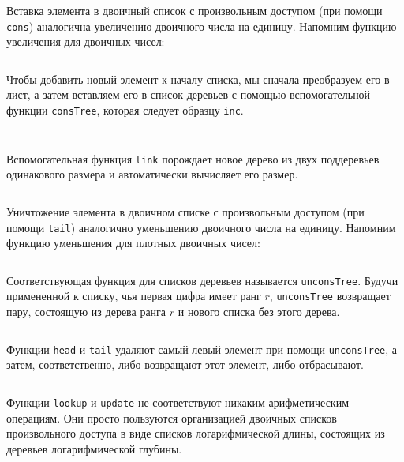 \begin{frame}[fragile]{}
Вставка элемента в двоичный список с произвольным доступом (при помощи
\lstinline!cons!) аналогична увеличению двоичного числа на
единицу. Напомним функцию увеличения для двоичных чисел:

\inputminted[firstline=5,lastline=7]{haskell}{code/DenseNumbers.hs}


Чтобы добавить новый элемент к началу списка, мы сначала преобразуем
его в лист, а затем вставляем его в список деревьев с помощью
вспомогательной функции \lstinline!consTree!, которая следует образцу
\lstinline!inc!.

\inputminted[firstline=30,lastline=30,gobble=2]{haskell}{code/BinaryRandomAccessList.lhs}
\inputminted[firstline=16,lastline=18]{haskell}{code/BinaryRandomAccessList.lhs}

Вспомогательная функция \lstinline!link! порождает новое дерево из двух
поддеревьев одинакового размера и автоматически вычисляет его размер.

\inputminted[firstline=14]{haskell}{code/BinaryRandomAccessList.lhs}
\end{frame}

\begin{frame}[fragile]{}
Уничтожение элемента в двоичном списке с произвольным доступом (при
помощи \lstinline!tail!) аналогично уменьшению двоичного числа на
единицу. Напомним функцию уменьшения для плотных двоичных чисел:
\inputminted[firstline=8,lastline=10]{haskell}{code/DenseNumbers.hs}

Соответствующая функция для списков деревьев называется
\lstinline!unconsTree!. Будучи примененной к списку, чья первая цифра
имеет ранг $r$, \lstinline!unconsTree! возвращает пару, состоящую из
дерева ранга $r$ и нового списка без этого дерева.
\inputminted[firstline=20,lastline=24]{haskell}{code/BinaryRandomAccessList.lhs}
\end{frame}

\begin{frame}[fragile]{}
Функции \lstinline!head! и \lstinline!tail!  удаляют самый левый
элемент при помощи \lstinline!unconsTree!, а затем, соответственно,
либо возвращают этот элемент, либо отбрасывают.
\inputminted[firstline=31,lastline=32]{haskell}{code/BinaryRandomAccessList.lhs}

Функции \lstinline!lookup! и \lstinline!update! не соответствуют
никаким арифметическим операциям. Они просто пользуются организацией
двоичных списков произвольного доступа в виде списков логарифмической
длины, состоящих из деревьев логарифмической глубины. 

\end{frame}


